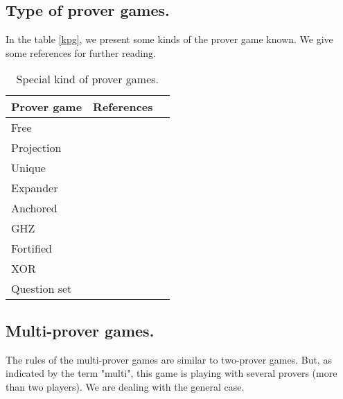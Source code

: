 


\subsection{Type of prover games.}

In the table \eqref{kpg}, we present some kinds of the prover game known. We give some references for further reading.

\begin{table}[h]
\begin{center}
\begin{tabular}{lll}
\hline 
\textbf{Prover game} &  \textbf{References} \\ 
\hline 
Free & \cite{verbitsky1996towards} \\ Projection & \cite{rao2011parallel} \\ Unique &\cite{tamaki2015parallel}  \\ Expander & \cite{dinur2016multiplayer} \\ Anchored & \cite{bavarian2015anchoring} \\ GHZ & \cite{dinur2016multiplayer} \\ Fortified & \cite{moshkovitz2014parallel} \\ XOR & \cite{cleve2007perfect} \\ Question set & \cite{hkazla2016forbidden}\\
\hline 
\end{tabular} 
\end{center}
\caption{Special kind of prover games.} \label{kpg}
\end{table}




\subsection{Multi-prover games.} The rules of the multi-prover games are similar to two-prover games. But, as indicated by the term "multi", this game is playing with several provers (more than two players). We are dealing with the general case.

